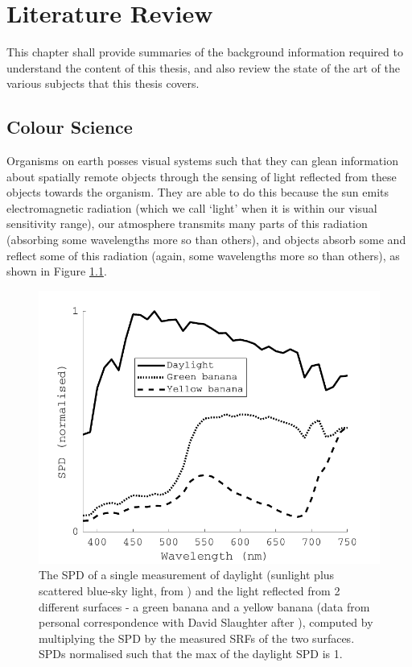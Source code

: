 \chapter{Literature Review}
\label{LitReview}

This chapter shall provide summaries of the background information required to understand the content of this thesis, and also review the state of the art of the various subjects that this thesis covers.

\section{Colour Science}

Organisms on earth posses visual systems such that they can glean information about spatially remote objects through the sensing of light reflected from these objects towards the organism. They are able to do this because the sun emits electromagnetic radiation (which we call `light' when it is within our visual sensitivity range), our atmosphere transmits many parts of this radiation (absorbing some wavelengths more so than others), and objects absorb some and reflect some of this radiation (again, some wavelengths more so than others), as shown in Figure \ref{fig:SPD}.

\begin{figure}[hbtp]
\includegraphics[max width=\textwidth]{figs/LitRev/daylightAndBananas.pdf}
\caption{The \gls{SPD} of a single measurement of daylight (sunlight plus scattered blue-sky light, from \citet{hernandez-andres_color_2001}) and the light reflected from 2 different surfaces - a green banana and a yellow banana (data from personal correspondence with David Slaughter after \citet{li_optical_1997}), computed by multiplying the \gls{SPD} by the measured \glspl{SRF} of the two surfaces. \Glspl{SPD} normalised such that the max of the daylight \gls{SPD} is 1.}
\label{fig:SPD}
\end{figure}

